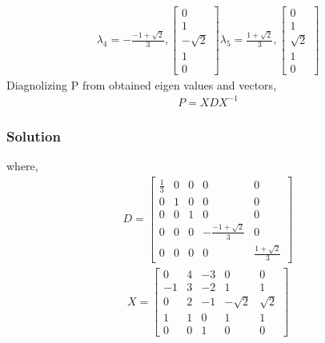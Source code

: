 \documentclass{beamer}
\begin{document}
\begin{frame}
\begin{align}
\lambda_{4} = 
- \frac{-1 + \sqrt{2}}{3}, \left[\begin{array}{c}0\\1\\- \sqrt{2}\\1\\0\end{array}\right]
\lambda_{5}= 
\frac{1 + \sqrt{2}}{3},\left[\begin{array}{c}0\\1\\\sqrt{2}\\1\\0\end{array}\right]
\end{align}
Diagnolizing P from obtained eigen values and vectors,
\begin{align}
    P = X D X^{-1}
\end{align}
\end{frame}

\begin{frame}
\frametitle{Solution}
where,
\begin{align}
    D = \left[\begin{array}{ccccc}\frac{1}{3} & 0 & 0 & 0 & 0\\0 & 1 & 0 & 0 & 0\\0 & 0 & 1 & 0 & 0\\0 & 0 & 0 & - \frac{-1 + \sqrt{2}}{3} & 0\\0 & 0 & 0 & 0 & \frac{1 + \sqrt{2}}{3}\end{array}\right]
\end{align}
\begin{align}
    X = \left[\begin{array}{ccccc}0 & 4 & -3 & 0 & 0\\-1 & 3 & -2 & 1 & 1\\0 & 2 & -1 & - \sqrt{2} & \sqrt{2}\\1 & 1 & 0 & 1 & 1\\0 & 0 & 1 & 0 & 0\end{array}\right]
\end{align}
\end{frame}
\end{document}
